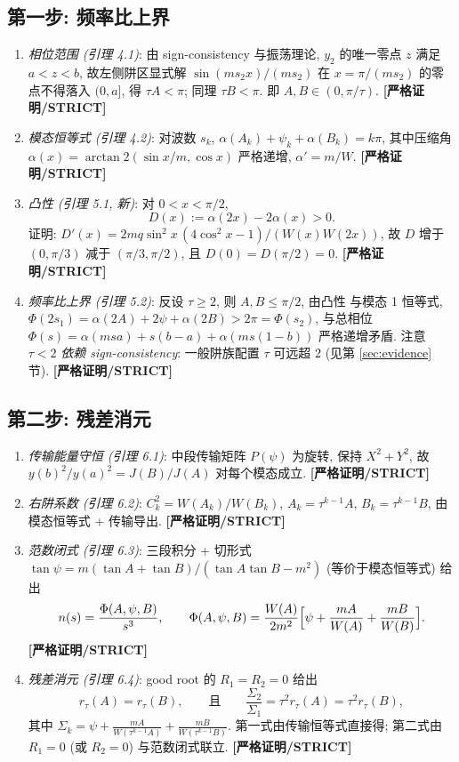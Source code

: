\documentclass[UTF8]{ctexart}
\newcommand{\STRICT}{\textbf{[严格证明/STRICT]}}
\begin{document}
\subsection{第一步: 频率比上界}

\begin{enumerate}
	\item \emph{相位范围 (引理 4.1)}: 由 sign-consistency 与振荡理论,
		$y_2$ 的唯一零点 $z$ 满足 $a<z<b$, 故左侧阱区显式解
		$\sin(ms_2x)/(ms_2)$ 在 $x=\pi/(ms_2)$ 的零点不得落入 $(0,a]$,
		得 $\tau A<\pi$; 同理 $\tau B<\pi$. 即 $A,B\in(0,\pi/\tau)$. \STRICT{}
	\item \emph{模态恒等式 (引理 4.2)}: 对波数 $s_k$,
		$\alpha(A_k)+\psi_k+\alpha(B_k)=k\pi$, 其中压缩角
		$\alpha(x)=\arctan2(\sin x/m,\cos x)$ 严格递增, $\alpha'=m/W$. \STRICT{}
	\item \emph{凸性 (引理 5.1, 新)}: 对 $0<x<\pi/2$,
		\begin{equation}
			D(x):=\alpha(2x)-2\alpha(x)>0.
		\end{equation}
		证明: $D'(x)=2mq\sin^2x\,(4\cos^2x-1)/(W(x)W(2x))$, 故 $D$ 增于
		$(0,\pi/3)$ 减于 $(\pi/3,\pi/2)$, 且 $D(0)=D(\pi/2)=0$. \STRICT{}
	\item \emph{频率比上界 (引理 5.2)}: 反设 $\tau\ge2$, 则 $A,B\le\pi/2$, 由凸性
		与模态 1 恒等式, $\Phi(2s_1)=\alpha(2A)+2\psi+\alpha(2B)>2\pi=\Phi(s_2)$,
		与总相位 $\Phi(s)=\alpha(msa)+s(b-a)+\alpha(ms(1-b))$ 严格递增矛盾.
		注意 $\tau<2$ \emph{依赖 sign-consistency}: 一般阱族配置 $\tau$ 可远超 2
		(见第 \ref{sec:evidence} 节). \STRICT{}
\end{enumerate}

\subsection{第二步: 残差消元}

\begin{enumerate}
	\item \emph{传输能量守恒 (引理 6.1)}: 中段传输矩阵 $P(\psi)$ 为旋转, 保持
		$X^2+Y^2$, 故 $y(b)^2/y(a)^2=J(B)/J(A)$ 对每个模态成立. \STRICT{}
	\item \emph{右阱系数 (引理 6.2)}: $C_k^2=W(A_k)/W(B_k)$,
		$A_k=\tau^{k-1}A$, $B_k=\tau^{k-1}B$, 由模态恒等式 + 传输导出. \STRICT{}
	\item \emph{范数闭式 (引理 6.3)}: 三段积分 + 切形式
		$\tan\psi=m(\tan A+\tan B)/(\tan A\tan B-m^2)$ (等价于模态恒等式) 给出
		\begin{equation}
			n(s)=\frac{\Phi(A,\psi,B)}{s^3},\qquad
			\Phi(A,\psi,B)=\frac{W(A)}{2m^2}
			\Bigl[\psi+\frac{mA}{W(A)}+\frac{mB}{W(B)}\Bigr].
		\end{equation}
		\STRICT{}
	\item \emph{残差消元 (引理 6.4)}: good root 的 $R_1=R_2=0$ 给出
		\begin{equation}
			r_\tau(A)=r_\tau(B),\qquad\text{且}\qquad
			\frac{\Sigma_2}{\Sigma_1}=\tau^2r_\tau(A)=\tau^2r_\tau(B),
		\end{equation}
		其中 $\Sigma_k=\psi+\frac{mA}{W(\tau^{k-1}A)}+\frac{mB}{W(\tau^{k-1}B)}$.
		第一式由传输恒等式直接得; 第二式由 $R_1=0$ (或 $R_2=0$) 与范数闭式联立.
		\STRICT{}
\end{enumerate}
\end{document}
